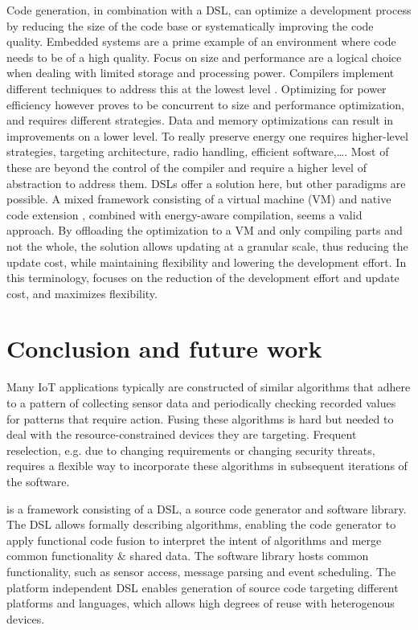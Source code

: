 \documentclass[3p,times,procedia]{elsarticle}
\begin{document}
Code generation, in combination with a DSL, can optimize a development process
by reducing the size of the code base or systematically improving the code
quality. Embedded systems are a prime example of an environment where code
needs to be of a high quality. Focus on size and performance are a logical
choice when dealing with limited storage and processing power. Compilers
implement different techniques to address this at the lowest level
\cite{marwedel2002code}. Optimizing for power efficiency however proves to be
concurrent to size and performance optimization, and requires different
strategies. Data and memory optimizations \cite{panda2001data} can result in
improvements on a lower level. To really preserve energy one requires
higher-level strategies, targeting architecture, radio handling, efficient
software,\dots \cite{naik2001software}. Most of these are beyond the control of
the compiler and require a higher level of abstraction to address them. DSLs
offer a solution here, but other paradigms are possible. A mixed framework
consisting of a virtual machine (VM) and native code extension
\cite{sadilek2007energy}, combined with energy-aware compilation, seems a valid
approach. By offloading the optimization to a VM and only compiling parts and
not the whole, the solution allows updating at a granular scale, thus reducing
the update cost, while maintaining flexibility and lowering the development
effort. In this terminology, \FOO focuses on the reduction of the development
effort and update cost, and maximizes flexibility.

\section{Conclusion and future work}
\label{conclusion}

Many IoT applications typically are constructed of similar algorithms that
adhere to a pattern of collecting sensor data and periodically checking
recorded values for patterns that require action. Fusing these algorithms is
hard but needed to deal with the resource-constrained devices they are
targeting. Frequent reselection, e.g. due to changing requirements or changing
security threats, requires a flexible way to incorporate these algorithms in
subsequent iterations of the software.

\FOO is a framework consisting of a DSL, a source code generator and software
library. The DSL allows formally describing algorithms, enabling the code
generator to apply functional code fusion to interpret the intent of algorithms
and merge common functionality \& shared data. The software library hosts
common functionality, such as sensor access, message parsing and event
scheduling. The platform independent DSL enables generation of source code
targeting different platforms and languages, which allows high degrees of reuse
with heterogenous devices.
\end{document}
